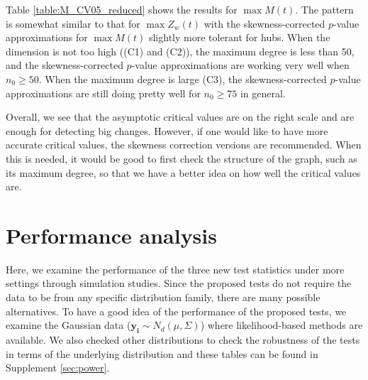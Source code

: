 \documentclass[arxiv, preprint]{imsart}
\numberwithin{equation}{section}
\theoremstyle{plain}
\begin{document}
Table \ref{table:M_CV05_reduced} shows the results for $\max M(t)$.  The pattern is somewhat similar to that for $\max Z_w(t)$ with the skewness-corrected $p$-value approximations for $\max M(t)$ slightly more tolerant for hubs.   When the dimension is not too high ((C1) and (C2)), the maximum degree is less than 50, and the skewness-corrected $p$-value approximations are working very well when $n_0\geq 50$.  When the maximum degree is large (C3), the skewness-corrected $p$-value approximations are still doing pretty well for $n_0\geq 75$ in general. 


Overall, we see that the asymptotic critical values are on the right scale and are enough for detecting big changes. However, if one would like to have more accurate critical values, the skewness correction versions are recommended.  When this is needed, it would be good to first check the structure of the graph, such as its maximum degree, so that we have a better idea on how well the critical values are.

\section{Performance analysis} \label{sec:5} Here, we examine the performance of the three new test statistics under more settings through simulation studies. Since the proposed tests do not require the data to be from any specific distribution family, there are many possible alternatives. To have a good idea of the performance of the proposed tests, we examine the Gaussian data ($\mathbf{y_i}\sim N_d(\mu, \Sigma)$) where likelihood-based methods are available. We also checked other distributions to check the robustness of the tests in terms of the underlying distribution and these tables can be found in Supplement \ref{sec:power}. 
\end{document}
